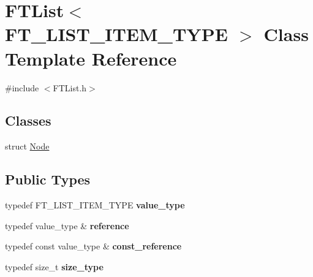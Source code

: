 \hypertarget{class_f_t_list}{}\section{F\+T\+List$<$ F\+T\+\_\+\+L\+I\+S\+T\+\_\+\+I\+T\+E\+M\+\_\+\+T\+Y\+PE $>$ Class Template Reference}
\label{class_f_t_list}


{\ttfamily \#include $<$F\+T\+List.\+h$>$}

\subsection*{Classes}
\begin{DoxyCompactItemize}
\item 
struct \hyperlink{struct_f_t_list_1_1_node}{Node}
\end{DoxyCompactItemize}
\subsection*{Public Types}
\begin{DoxyCompactItemize}
\item 
typedef F\+T\+\_\+\+L\+I\+S\+T\+\_\+\+I\+T\+E\+M\+\_\+\+T\+Y\+PE {\bfseries value\+\_\+type}\hypertarget{class_f_t_list_ae172da3e03bcd6dab4b5f60efe0fc7a3}{}\label{class_f_t_list_ae172da3e03bcd6dab4b5f60efe0fc7a3}

\item 
typedef value\+\_\+type \& {\bfseries reference}\hypertarget{class_f_t_list_a37fe33040a67a2d5aad9ead2bb2179d7}{}\label{class_f_t_list_a37fe33040a67a2d5aad9ead2bb2179d7}

\item 
typedef const value\+\_\+type \& {\bfseries const\+\_\+reference}\hypertarget{class_f_t_list_a82677d676935b1f3cb5e9328523bf3a6}{}\label{class_f_t_list_a82677d676935b1f3cb5e9328523bf3a6}

\item 
typedef size\+\_\+t {\bfseries size\+\_\+type}\hypertarget{class_f_t_list_a5ebe9866c4f86791c6970f19deb09cb1}{}\label{class_f_t_list_a5ebe9866c4f86791c6970f19deb09cb1}

\end{DoxyCompactItemize}
